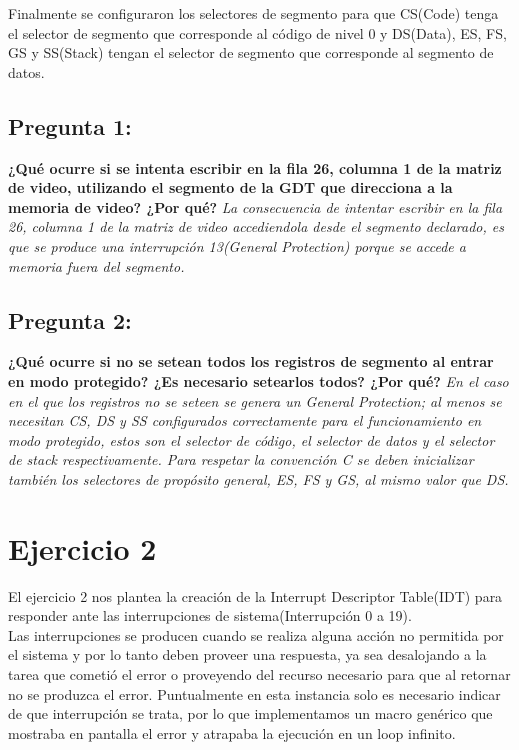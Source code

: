 \documentclass[10pt, a4paper]{article}
\begin{document}
Finalmente se configuraron los selectores de segmento para que CS(Code) tenga el selector de segmento que corresponde al c\'odigo de nivel 0 y DS(Data), ES, FS, GS y SS(Stack) tengan el selector de segmento que corresponde al segmento de datos.

{\subsection{Pregunta 1:}} \textbf{¿Qué ocurre si se intenta escribir en la fila 26, columna 1 de la matriz de video, utilizando el segmento de la GDT que direcciona a la memoria de video? ¿Por qué?}\newline
\newline
\textit{La consecuencia de intentar escribir en la fila 26, columna 1 de la matriz de video accediendola desde el segmento declarado, es que se produce una interrupción 13(General Protection) porque se accede a memoria fuera del segmento.}\newline
\newline
{\subsection{Pregunta 2:}} \textbf{¿Qué ocurre si no se setean todos los registros de segmento al entrar en modo protegido? ¿Es necesario setearlos todos? ¿Por qué?}\newline
\newline
\textit{En el caso en el que los registros no se seteen se genera un General Protection; al menos se necesitan CS, DS y SS configurados correctamente para el funcionamiento en modo protegido, estos son el selector de c\'odigo, el selector de datos y el selector de stack respectivamente. Para respetar la convenci\'on C se deben inicializar tambi\'en los selectores de prop\'osito general, ES, FS y GS, al mismo valor que DS.}

\section{Ejercicio 2}
El ejercicio 2 nos plantea la creaci\'on de la Interrupt Descriptor Table(IDT) para responder ante las interrupciones de sistema(Interrupci\'on 0 a 19).\\
Las interrupciones se producen cuando se realiza alguna acción no permitida por el sistema y por lo tanto deben proveer una respuesta, ya sea desalojando a la tarea que cometi\'o el error o proveyendo del recurso necesario para que al retornar no se produzca el error. Puntualmente en esta instancia solo es necesario indicar de que interrupci\'on se trata, por lo que implementamos un macro gen\'erico que mostraba en pantalla el error y atrapaba la ejecuci\'on en un loop infinito.\newline
\end{document}
